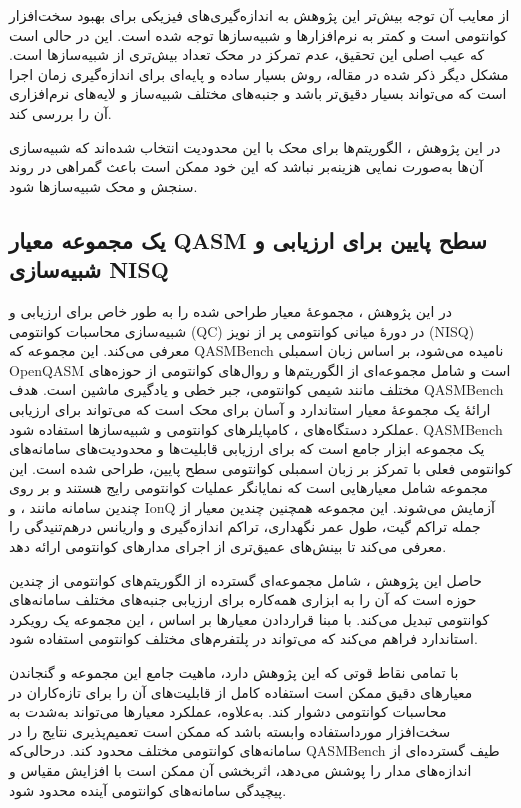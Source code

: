 از معایب آن توجه بیش‌تر این پژوهش
\cite{lubinski_application-oriented_2023}
به اندازه‌گیری‌های فیزیکی برای بهبود سخت‌افزار کوانتومی است و کمتر به نرم‌افزارها و شبیه‌سازها توجه شده است. این در حالی است که عیب اصلی این تحقیق، عدم تمرکز در محک تعداد بیش‌تری از شبیه‌سازها است. مشکل دیگر ذکر شده در مقاله، روش بسیار ساده و پایه‌ای برای اندازه‌گیری زمان اجرا است که می‌تواند بسیار دقیق‌تر باشد و جنبه‌های مختلف شبیه‌ساز و لایه‌های نرم‌افزاری آن را بررسی کند.

در این پژوهش
\cite{lubinski_application-oriented_2023}،
الگوریتم‌ها برای محک با این محدودیت انتخاب شده‌اند که شبیه‌سازی آن‌ها به‌صورت نمایی هزینه‌بر نباشد که این خود ممکن است باعث گمراهی در روند سنجش و محک شبیه‌سازها شود.

\subsection{ یک مجموعه معیار QASM سطح پایین برای ارزیابی و شبیه‌سازی NISQ\cite{li_qasmbench_2022}}
در این پژوهش
\cite{li_qasmbench_2022}،
مجموعهٔ معیار طراحی شده را به طور خاص برای ارزیابی و شبیه‌سازی محاسبات کوانتومی (QC) در دورهٔ میانی کوانتومی پر از نویز (NISQ) معرفی می‌کند. این مجموعه که QASMBench نامیده می‌شود، بر اساس زبان اسمبلی OpenQASM است و شامل مجموعه‌ای از الگوریتم‌ها و روال‌های کوانتومی از حوزه‌های مختلف مانند شیمی کوانتومی، جبر خطی و یادگیری ماشین است. هدف QASMBench ارائهٔ یک مجموعهٔ معیار استاندارد و آسان برای محک است که می‌تواند برای ارزیابی عملکرد دستگاه‌های ، کامپایلرهای کوانتومی و شبیه‌سازها استفاده شود.
QASMBench
یک مجموعه ابزار جامع است که برای ارزیابی قابلیت‌ها و محدودیت‌های سامانه‌های کوانتومی فعلی با تمرکز بر زبان اسمبلی کوانتومی سطح پایین، طراحی شده است. این مجموعه شامل معیارهایی است که نمایانگر عملیات کوانتومی رایج هستند و بر روی چندین سامانه مانند  ، و IonQ آزمایش می‌شوند. این مجموعه همچنین چندین معیار از جمله تراکم گیت، طول عمر نگهداری، تراکم اندازه‌گیری و واریانس درهم‌تنیدگی را معرفی می‌کند تا بینش‌های عمیق‌تری از اجرای مدارهای کوانتومی ارائه دهد.

حاصل این پژوهش
\cite{li_qasmbench_2022}،
شامل مجموعه‌ای گسترده از الگوریتم‌های کوانتومی از چندین حوزه است که آن را به ابزاری همه‌کاره برای ارزیابی جنبه‌های مختلف سامانه‌های کوانتومی تبدیل می‌کند. با مبنا قراردادن معیارها بر اساس
،
این مجموعه یک رویکرد استاندارد فراهم می‌کند که می‌تواند در پلتفرم‌های مختلف کوانتومی استفاده شود.

با تمامی نقاط قوتی که این پژوهش
\cite{li_qasmbench_2022}
دارد، ماهیت جامع این مجموعه و گنجاندن معیارهای دقیق ممکن است استفاده کامل از قابلیت‌های آن را برای تازه‌کاران در محاسبات کوانتومی دشوار کند. به‌علاوه، عملکرد معیارها می‌تواند به‌شدت به سخت‌افزار مورداستفاده وابسته باشد که ممکن است تعمیم‌پذیری نتایج را در سامانه‌های کوانتومی مختلف محدود کند. درحالی‌که QASMBench طیف گسترده‌ای از اندازه‌های مدار را پوشش می‌دهد، اثربخشی آن ممکن است با افزایش مقیاس و پیچیدگی سامانه‌های کوانتومی آینده محدود شود.

